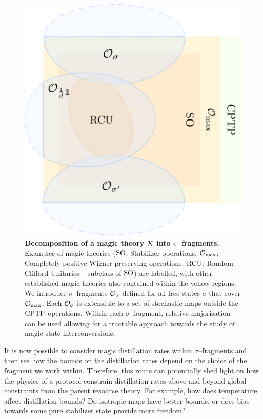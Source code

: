 \documentclass[pra,
aps,
twocolumn,
superscriptaddress,
groupedaddress,
nofootinbib,
reprint
]{revtex4-1}
\begin{document}
\begin{figure}[t]
    \centering
        \includegraphics[scale=0.3
        ]{figs/operations.pdf}
    \caption{\textbf{Decomposition of a magic theory $\mathcal{R}$ into $\sigma$--fragments.} 
	Examples of magic theories (${\rm{SO}}$: Stabilizer operations, $\mathcal{O}_{\rm{max}}$: Completely positive-Wigner-preserving operations, ${\rm{RCU}}$: Random Clifford Unitaries -- subclass of ${\rm{SO}}$) are labelled, with other established magic theories also contained within the yellow regions.
    We introduce $\sigma$--fragments $\mathcal{O}_\sigma$ defined for all free states $\sigma$ that cover $\mathcal{O}_{\rm{max}}$. 
    Each $\mathcal{O}_\sigma$ is extensible to a set of stochastic maps outside the ${\rm{CPTP}}$ operations.
    Within each $\sigma$--fragment, relative majorisation can be used allowing for a tractable approach towards the study of magic state interconversions.
    }
    \label{fig:zoo}
\end{figure}

It is now possible to consider magic distillation rates within $\sigma$--fragments and then see how the bounds on the distillation rates depend on the choice of the fragment we work within. Therefore, this route can potentially shed light on how the physics of a protocol constrain distillation rates above and beyond global constraints from the parent resource theory. For example, how does temperature affect distillation bounds? Do isotropic maps have better bounds, or does bias towards some pure stabilizer state provide more freedom?
\end{document}
